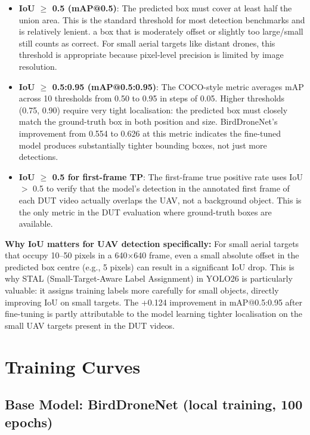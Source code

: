 \documentclass[12pt,a4paper]{report}
\begin{document}
\begin{itemize}
  \item \textbf{IoU $\geq$ 0.5 (mAP@0.5)}: The predicted box must cover at
        least half the union area. This is the standard threshold for most
        detection benchmarks and is relatively lenient. a box that is
        moderately offset or slightly too large/small still counts as correct.
        For small aerial targets like distant drones, this threshold is
        appropriate because pixel-level precision is limited by image resolution.

  \item \textbf{IoU $\geq$ 0.5:0.95 (mAP@0.5:0.95)}: The COCO-style metric
        averages mAP across 10 thresholds from 0.50 to 0.95 in steps of 0.05.
        Higher thresholds (0.75, 0.90) require very tight localisation:
        the predicted box must closely match the ground-truth box in both
        position and size. BirdDroneNet's improvement from 0.554 to 0.626
        at this metric indicates the fine-tuned model produces substantially
        tighter bounding boxes, not just more detections.

  \item \textbf{IoU $\geq$ 0.5 for first-frame TP}: The first-frame true
        positive rate uses IoU $>$ 0.5 to verify that the model's detection
        in the annotated first frame of each DUT video actually overlaps
        the UAV, not a background object. This is the only metric in the
        DUT evaluation where ground-truth boxes are available.
\end{itemize}

\textbf{Why IoU matters for UAV detection specifically:}
For small aerial targets that occupy 10--50 pixels in a 640$\times$640 frame,
even a small absolute offset in the predicted box centre (e.g., 5 pixels)
can result in a significant IoU drop. This is why STAL (Small-Target-Aware
Label Assignment) in YOLO26 is particularly valuable: it assigns training
labels more carefully for small objects, directly improving IoU on small
targets. The +0.124 improvement in mAP@0.5:0.95 after fine-tuning is
partly attributable to the model learning tighter localisation on the
small UAV targets present in the DUT videos.

\section{Training Curves}

\subsection{Base Model: BirdDroneNet (local training, 100 epochs)}
\end{document}
